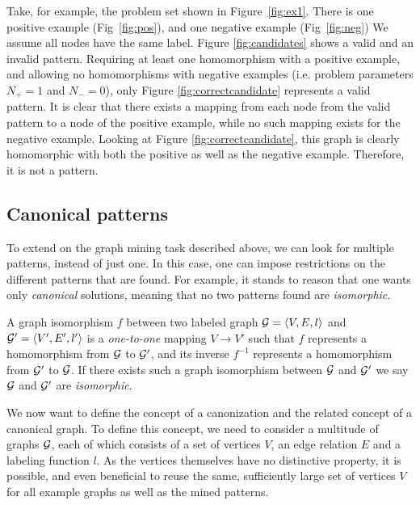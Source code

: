 Take, for example, the problem set shown in Figure~\ref{fig:ex1}.
There is one positive example (Fig~\ref{fig:pos}), and one negative example (Fig~\ref{fig:neg})
We assume all nodes have the same label.
Figure \ref{fig:candidates} shows a valid and an invalid pattern.
Requiring at least one homomorphism with a positive example, and allowing no homomorphisms with negative examples (i.e. problem parameters $N_{+}=1$ and $N_{-}=0$), only Figure \ref{fig:correctcandidate} represents a valid pattern.
It is clear that there exists a mapping from each node from the valid pattern to a node of the positive example, while no such mapping exists for the negative example.
Looking at Figure \ref{fig:correctcandidate}, this graph is clearly homomorphic with both the positive as well as the negative example. Therefore, it is not a pattern.

\subsection{Canonical patterns}
To extend on the graph mining task described above, we can look for multiple patterns, instead of just one.
In this case, one can impose restrictions on the different patterns that are found.
For example, it stands to reason that one wants only \emph{canonical} solutions, meaning that no two patterns found are \emph{isomorphic}.

\begin{definition}
\label{def:isomorphism}
A graph isomorphism $f$ between two labeled graph $\mathcal{G} = \langle V,E,l \rangle$ and $\mathcal{G'} = \langle V',E',l' \rangle$ is a \emph{one-to-one} mapping $V \rightarrow V'$ 
such that $f$ represents a homomorphism from $\mathcal{G}$ to $\mathcal{G'}$,
and its inverse $f^{-1}$ represents a homomorphism from $\mathcal{G'}$ to $\mathcal{G}$.
If there exists such a graph isomorphism between $\mathcal{G}$ and $\mathcal{G'}$ we say $\mathcal{G}$ and $\mathcal{G'}$ are \emph{isomorphic}.
\end{definition}

We now want to define the concept of a canonization and the related concept of a canonical graph. 
To define this concept, we need to consider a multitude of graphs $\mathcal{G}$, each of which consists of a set of vertices $V$, an edge relation $E$ and a labeling function $l$. 
As the vertices themselves have no distinctive property, it is possible, and even beneficial to reuse the same, sufficiently large set of vertices $V$ for all example graphs as well as the mined patterns.

